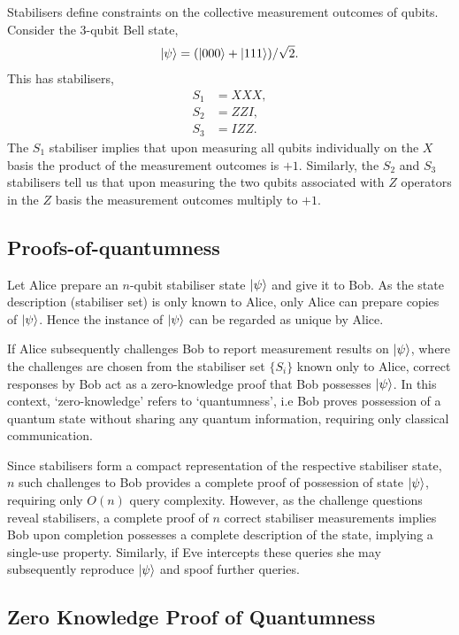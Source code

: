 \documentclass[twocolumn, aps, amsmath, amssymb, nofootinbib, superscriptaddress, longbibliography, doublefloatfix, table-of-contents, eqsecnum, rmp]{revtex4-2}
\begin{document}
Stabilisers define constraints on the collective measurement outcomes of qubits. Consider the 3-qubit Bell state,
\begin{align}	
	\ket\psi = (\ket{000}+\ket{111})/\sqrt{2}.
\end{align}
This has stabilisers,
\begin{align}	
	S_1 &= XXX,\nonumber\\
	S_2 &= ZZI,\nonumber\\
	S_3 &= IZZ.
\end{align}
The $S_1$ stabiliser implies that upon measuring all qubits individually on the $X$ basis the product of the measurement outcomes is $+1$. Similarly, the $S_2$ and $S_3$ stabilisers tell us that upon measuring the two qubits associated with $Z$ operators in the $Z$ basis the measurement outcomes multiply to $+1$.

\subsection{Proofs-of-quantumness}

Let Alice prepare an $n$-qubit stabiliser state $\ket\psi$ and give it to Bob. As the state description (stabiliser set) is only known to Alice, only Alice can prepare copies of $\ket\psi$. Hence the instance of $\ket\psi$ can be regarded as unique by Alice.

If Alice subsequently challenges Bob to report measurement results on $\ket\psi$, where the challenges are chosen from the stabiliser set $\{S_i\}$ known only to Alice, correct responses by Bob act as a zero-knowledge proof that Bob possesses $\ket\psi$. In this context, `zero-knowledge' refers to `quantumness', i.e Bob proves possession of a quantum state without sharing any quantum information, requiring only classical communication.

Since stabilisers form a compact representation of the respective stabiliser state, $n$ such challenges to Bob provides a complete proof of possession of state $\ket\psi$, requiring only $O(n)$ query complexity. However, as the challenge questions reveal stabilisers, a complete proof of $n$ correct stabiliser measurements implies Bob upon completion possesses a complete description of the state, implying a single-use property. Similarly, if Eve intercepts these queries she may subsequently reproduce $\ket\psi$ and spoof further queries.

\subsection{Zero Knowledge Proof of Quantumness}
\end{document}
